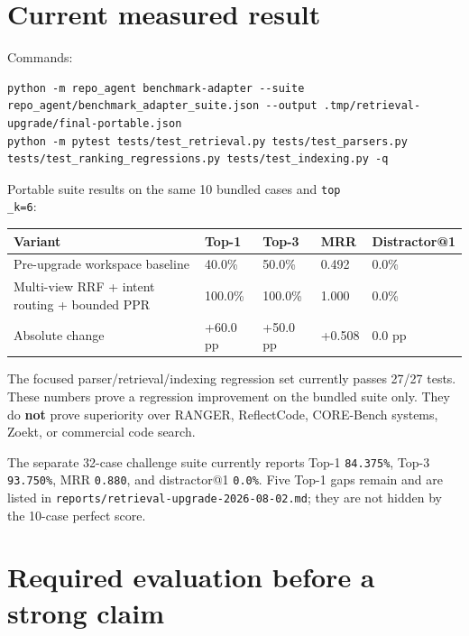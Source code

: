\documentclass[UTF8,12pt,openany]{ctexbook}
\begin{document}
\section{Current measured result}

Commands:\par

\begin{lstlisting}
python -m repo_agent benchmark-adapter --suite repo_agent/benchmark_adapter_suite.json --output .tmp/retrieval-upgrade/final-portable.json
python -m pytest tests/test_retrieval.py tests/test_parsers.py tests/test_ranking_regressions.py tests/test_indexing.py -q
\end{lstlisting}

Portable suite results on the same 10 bundled cases and \texttt{top\\_k=6}:\par

\begin{center}
\small
\begin{longtable}{|p{}|p{}|p{}|p{}|p{}|}
\toprule
Variant & Top-1 & Top-3 & MRR & Distractor@1 \\
\midrule
Pre-upgrade workspace baseline & 40.0\% & 50.0\% & 0.492 & 0.0\% \\
Multi-view RRF + intent routing + bounded PPR & 100.0\% & 100.0\% & 1.000 & 0.0\% \\
Absolute change & +60.0 pp & +50.0 pp & +0.508 & 0.0 pp \\
\bottomrule
\end{longtable}
\end{center}

The focused parser/retrieval/indexing regression set currently passes 27/27 tests. These numbers prove a regression improvement on the bundled suite only. They do \textbf{not} prove superiority over RANGER, ReflectCode, CORE-Bench systems, Zoekt, or commercial code search.\par

The separate 32-case challenge suite currently reports Top-1 \texttt{84.375\%}, Top-3 \texttt{93.750\%}, MRR \texttt{0.880}, and distractor@1 \texttt{0.0\%}. Five Top-1 gaps remain and are listed in \texttt{reports/retrieval-upgrade-2026-08-02.md}; they are not hidden by the 10-case perfect score.\par

\section{Required evaluation before a strong claim}
\end{document}
